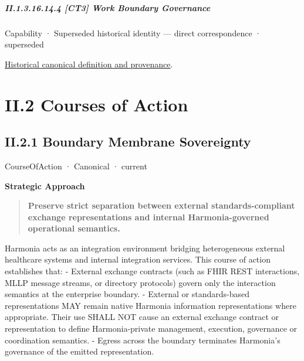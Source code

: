 \paragraph*{II.1.3.16.14.4 [CT3] Work Boundary Governance}
\label{navigation:II.1.3.16.14.4}

\label{element:b4d14abf930a4230a7f5b93e9ce3df91}
{\small Capability · Superseded historical identity — direct correspondence · superseded}\par
\href{../../../../continuum/strategy/capability/b4d14abf930a4230a7f5b93e9ce3df91.md}{Historical canonical definition and provenance}.\par
\chapter*{II.2 Courses of Action}
\label{navigation:II.2}

\section*{II.2.1 Boundary Membrane Sovereignty}
\label{navigation:II.2.1}

\label{element:25d8509146fd4f2794a17f4a5253b7a3}
{\small CourseOfAction · Canonical · current}\par

\par\medskip\textbf{Strategic Approach}\par


\begin{quote}


\textbf{Preserve strict separation between external standards-compliant exchange representations and internal Harmonia-governed operational semantics.}



\end{quote}


Harmonia acts as an integration environment bridging heterogeneous external healthcare systems and internal integration services. This course of action establishes that:
- External exchange contracts (such as FHIR REST interactions, MLLP message streams, or directory protocols) govern only the interaction semantics at the enterprise boundary.
- External or standards-based representations MAY remain native Harmonia information representations where appropriate. Their use SHALL NOT cause an external exchange contract or representation to define Harmonia-private management, execution, governance or coordination semantics.
- Egress across the boundary terminates Harmonia's governance of the emitted representation.




